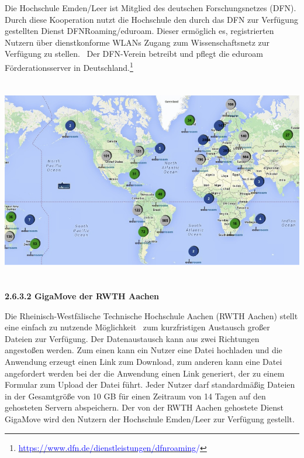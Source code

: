 \documentclass[a4paper]{article}
\makeatletter
\newcommand\textstyleAbsatzStandardschriftart[1]{#1}
\newcommand\textstyleHyperlink[1]{\textcolor{blue}{#1}}
\newcommand\captionof[1]{\def\@captype{#1}\caption}
\makeatother
\begin{document}
\bigskip

{\sffamily\mdseries\color{black}
Die Hochschule Emden/Leer ist Mitglied des deutschen Forschungsnetzes (DFN). Durch diese Kooperation nutzt die
Hochschule den durch das DFN zur Verfügung gestellten Dienst DFNRoaming/eduroam. Dieser ermöglich es, registrierten
Nutzern über dienstkonforme WLANs Zugang zum Wissenschaftsnetz zur Verfügung zu stellen. \ Der DFN-Verein betreibt und
pflegt die eduroam Förderationsserver in
Deutschland.\footnote{\href{https://www.dfn.de/dienstleistungen/dfnroaming/}{\textstyleHyperlink{https://www.dfn.de/dienstleistungen/dfnroaming}}\textstyleHyperlink{/}}}

{\sffamily\color{black}
\includegraphics[width=15.501cm,height=8.95cm]{EntwurfKapitel2Gruppe220150528VW-img/EntwurfKapitel2Gruppe220150528VW-img010.png}
\captionof{figure}[http://weill.cornell.edu/its/images/eduroam{}-map.jpg]{http://weill.cornell.edu/its/images/eduroam-map.jpg}
\textbf{2.6.3.2 GigaMove der RWTH Aachen}}


\bigskip

{\sffamily\mdseries\color{black}
\textstyleAbsatzStandardschriftart{Die Rheinisch-Westfälische Technische Hochschule Aachen (RWTH Aachen) stellt eine
einfach zu nutzende Möglichkeit \ zum kurzfristigen Austausch großer Dateien zur Verfügung. Der Datenaustausch kann aus
zwei Richtungen angestoßen werden. Zum einen kann ein Nutzer eine Datei hochladen und die Anwendung erzeugt einen Link
zum Download, zum anderen kann eine Datei angefordert werden bei der die Anwendung einen Link generiert, der zu einem
Formular zum Upload der Datei führt. Jeder Nutzer darf standardmäßig Dateien in der Gesamtgröße von 10 GB für einen
Zeitraum von 14 Tagen auf den gehosteten Servern abspeichern. Der von der RWTH Aachen gehostete Dienst GigaMove wird
den Nutzern der Hochschule Emden/Leer zur Verfügung gestellt.}}
\end{document}
